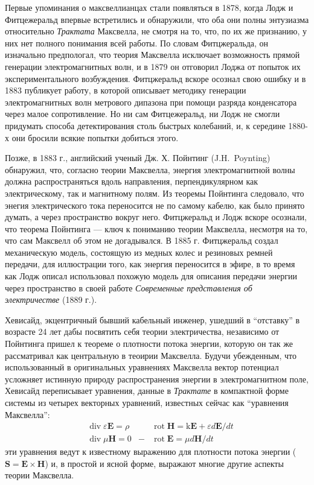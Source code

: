 \documentclass[12pt, oneside, a4paper]{article}
\begin{document}
Первые упоминания о максвеллианцах стали появляться в 1878, когда Лодж и Фитцежеральд впервые встретились и обнаружили, что оба они полны энтузиазма относительно \emph{Трактата} Максвелла, не смотря на то, что, по их же признанию, у них нет полного понимания всей работы. По словам Фитцжеральда, он изначально предпологал, что теория Максвелла исключает возможность прямой генерации электромагнитных волн, и в 1879 он отговорил Лоджа от попыток их экспериментального возбуждения. Фитцжеральд вскоре осознал свою ошибку и в 1883 публикует работу, в которой описывает методику генерации электромагнитных волн метрового дипазона при помощи разряда конденсатора через малое сопротивление. Но ни сам Фитцежеральд, ни Лодж не смогли придумать способа детектирования столь быстрых колебаний, и, к середине 1880-х они бросили всякие попытки добиться этого.

Позже, в 1883 г., английский ученый Дж. Х. Пойнтинг (J.H.~Poynting) обнаружил, что, согласно теории Максвелла, энергия электромагнитной волны должна распространяться вдоль направления, перпендикулярном как электрическому, так и магнитному полям. Из теоремы Пойнтинга следовало, что энегия электрического тока переносится не по самому кабелю, как было принято думать, а через пространство вокруг него. Фитцжеральд и Лодж вскоре осознали, что теорема Пойнтинга --- ключ к пониманию теории Максвелла, несмотря на то, что сам Максвелл об этом не догадывался. В 1885 г. Фитцжеральд создал механическую модель, состоящую из медных колес и резиновых ремней передачи, для иллюстрации того, как энергия переносится в эфире, в то время как Лодж описал использовал похожую модель для описания передачи энергии через пространство в своей работе \emph{Современные представления об электричестве} (1889 г.).

Хевисайд, экцентричный бывший кабельный инженер, ушедший в ``отставку'' в возрасте 24 лет дабы посвятить себя теории электричества, независимо от Пойнтинга пришел к теореме о плотности потока энергии, которую он так же рассматривал как центральную в теоирии Максвелла. Будучи убежденным, что использованный в оригинальных уравнениях Максвелла вектор потенциал усложняет истинную природу распространения энергии в электромагнитном поле, Хевисайд переписывает уравнения, данные в \emph{Трактате} в компактной форме системы из четырех векторных уравнений, известных сейчас как ``уравнения Максвелла'':
\begin{align*}
&\operatorname{div}\varepsilon{}\mathbf{E} = \rho& 
&\operatorname{rot}\mathbf{H}=\mathrm{k}\mathbf{E} + \varepsilon{}d\mathbf{E}/dt\\
&\operatorname{div}\mu{}\mathbf{H}=0& 
-&\operatorname{rot}\mathbf{E}=\mu{}d\mathbf{H}/dt
\end{align*}
эти уравнения ведут к известному выражению для плотности потока энергии ($\mathbf{S}=\mathbf{E}\times\mathbf{H}$) и, в простой и ясной форме, выражают многие другие аспекты теории Максвелла.
\end{document}
